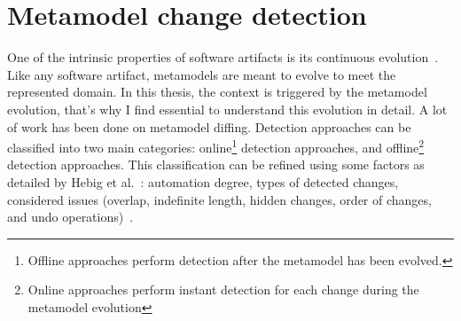  \section{Metamodel change detection}
 \label{changedetection}
 One of the intrinsic properties of software artifacts is its continuous evolution~\cite{mens2008introduction}. Like any software artifact, metamodels are meant to evolve to meet the represented domain. %
 In this thesis, the context is triggered by the metamodel evolution, that's why I find essential to understand this evolution in detail.
 A lot of work has been done on metamodel diffing.
 Detection approaches can be classified into two main categories: online\footnote{Offline approaches perform detection after the metamodel has been evolved.} detection approaches, and offline\footnote{Online approaches perform instant detection for each change during the metamodel evolution} detection approaches. This classification can be refined using some factors as detailed by Hebig et al.~\cite{hebig2016approaches}: automation degree, types of detected changes, considered issues (overlap, indefinite length, hidden changes, order of changes, and undo operations)~\cite{hebig2016approaches}.
 	
